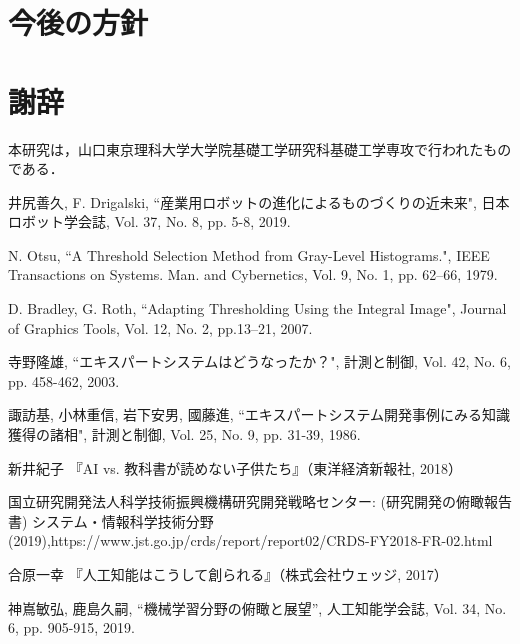 \documentclass{suribt}
\begin{document}
\chapter{今後の方針}









\backmatter%
\chapter{謝辞}%
本研究は，山口東京理科大学大学院基礎工学研究科基礎工学専攻で行われたものである．
\begin{thebibliography}{}%
井尻善久, F. Drigalski, ``産業用ロボットの進化によるものづくりの近未来", 日本ロボット学会誌, Vol. 37, No. 8, pp. 5-8, 2019.

N. Otsu, ``A Threshold Selection Method from Gray-Level Histograms.", IEEE Transactions on Systems. Man. and Cybernetics, Vol. 9, No. 1, pp. 62–66, 1979.

D. Bradley, G. Roth, ``Adapting Thresholding Using the Integral Image", Journal of Graphics Tools, Vol. 12, No. 2, pp.13–21, 2007.

寺野隆雄, ``エキスパートシステムはどうなったか？", 計測と制御, Vol. 42, No. 6, pp. 458-462, 2003.

諏訪基, 小林重信, 岩下安男, 國藤進, ``エキスパートシステム開発事例にみる知識獲得の諸相", 計測と制御, Vol. 25, No. 9, pp. 31-39, 1986.

新井紀子 『AI vs. 教科書が読めない子供たち』（東洋経済新報社, 2018）

国立研究開発法人科学技術振興機構研究開発戦略センター: (研究開発の俯瞰報告書) システム・情報科学技術分野 (2019),https://www.jst.go.jp/crds/report/report02/CRDS-FY2018-FR-02.html

合原一幸 『人工知能はこうして創られる』（株式会社ウェッジ, 2017）

神嶌敏弘, 鹿島久嗣, ``機械学習分野の俯瞰と展望'', 人工知能学会誌, Vol. 34, No. 6, pp. 905-915, 2019.

\end{thebibliography}
\end{document}
